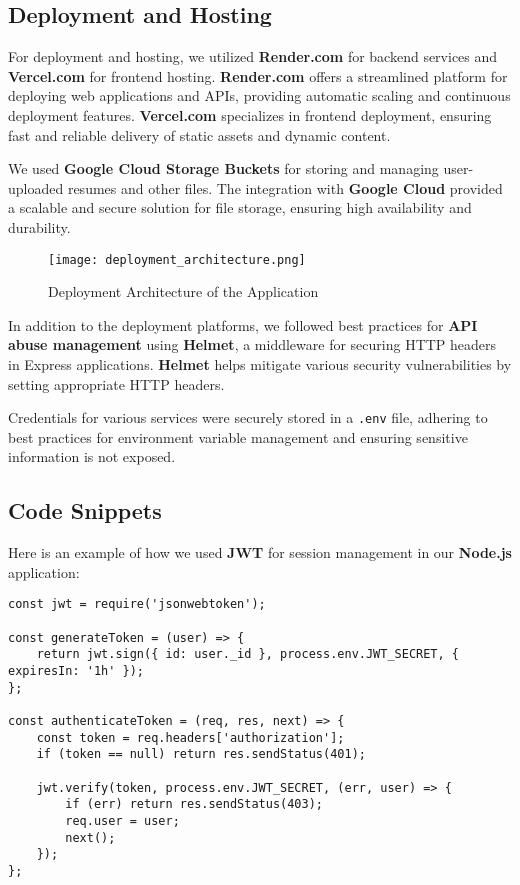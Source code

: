 \subsection{Deployment and Hosting}

For deployment and hosting, we utilized \textbf{Render.com} for backend services and \textbf{Vercel.com} for frontend hosting. \textbf{Render.com} offers a streamlined platform for deploying web applications and APIs, providing automatic scaling and continuous deployment features. \textbf{Vercel.com} specializes in frontend deployment, ensuring fast and reliable delivery of static assets and dynamic content.

We used \textbf{Google Cloud Storage Buckets} for storing and managing user-uploaded resumes and other files. The integration with \textbf{Google Cloud} provided a scalable and secure solution for file storage, ensuring high availability and durability.

\begin{figure}[h]
\centering
\texttt{[image: deployment\_architecture.png]}
\caption{Deployment Architecture of the Application}
\label{fig:deployment_architecture}
\end{figure}

In addition to the deployment platforms, we followed best practices for \textbf{API abuse management} using \textbf{Helmet}, a middleware for securing HTTP headers in Express applications. \textbf{Helmet} helps mitigate various security vulnerabilities by setting appropriate HTTP headers.

Credentials for various services were securely stored in a \texttt{.env} file, adhering to best practices for environment variable management and ensuring sensitive information is not exposed.

\subsection{Code Snippets}

Here is an example of how we used \textbf{JWT} for session management in our \textbf{Node.js} application:

\begin{verbatim}
const jwt = require('jsonwebtoken');

const generateToken = (user) => {
    return jwt.sign({ id: user._id }, process.env.JWT_SECRET, { expiresIn: '1h' });
};

const authenticateToken = (req, res, next) => {
    const token = req.headers['authorization'];
    if (token == null) return res.sendStatus(401);

    jwt.verify(token, process.env.JWT_SECRET, (err, user) => {
        if (err) return res.sendStatus(403);
        req.user = user;
        next();
    });
};
\end{verbatim}

